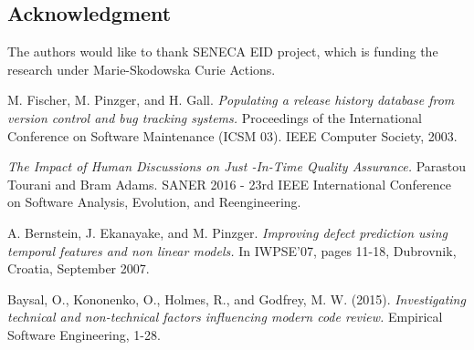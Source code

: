 \documentclass[conference,compsoc]{IEEEtran}
\begin{document}
\begin{itemize}
  \section*{Acknowledgment}
\fi


The authors would like to thank SENECA EID project, which
is funding the research under Marie-Skodowska Curie Actions.







%
%
%
\begin{thebibliography}{1}

M. Fischer, M. Pinzger, and H. Gall. \emph{Populating a
release history database from version control and bug
tracking systems.} Proceedings of the International
Conference on Software Maintenance (ICSM 03).
IEEE Computer Society, 2003.

\emph{The Impact of Human Discussions on Just -In-Time
Quality Assurance.} Parastou Tourani and Bram
Adams. SANER 2016 - 23rd IEEE International
Conference on Software Analysis, Evolution, and
Reengineering.

A. Bernstein, J. Ekanayake, and M. Pinzger.
\emph{Improving defect prediction using temporal features
and non linear models.} In IWPSE’07, pages 11-18,
Dubrovnik, Croatia, September 2007.

Baysal, O., Kononenko, O., Holmes, R., and Godfrey,
M. W. (2015). \emph{Investigating technical and
non-technical factors influencing modern code review.}
Empirical Software Engineering, 1-28.


\end{thebibliography}
\end{itemize}
\end{document}
